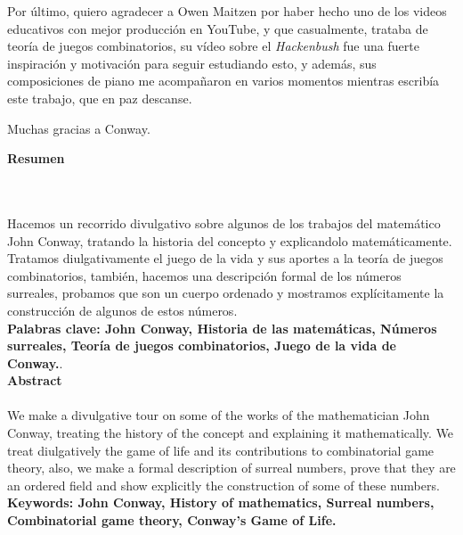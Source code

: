 Por \'ultimo, quiero agradecer a Owen Maitzen por haber hecho uno de los videos educativos con mejor producci\'on en YouTube, y que casualmente, trataba de teor\'ia de juegos combinatorios, su v\'ideo sobre el \textit{Hackenbush} \cite{YTHackenbush} fue una fuerte inspiraci\'on y motivaci\'on para seguir estudiando esto, y adem\'as, sus composiciones de piano me acompa\~naron en varios momentos mientras escrib\'ia este trabajo, que en paz descanse. 

Muchas gracias a Conway.

\newpage{\pagestyle{empty}\cleardoublepage}

\newpage
\textbf{\LARGE Resumen}
\\\\
Hacemos un recorrido divulgativo sobre algunos de los trabajos del matemático John Conway, tratando la historia del concepto y explicandolo matemáticamente. Tratamos diulgativamente el juego de la vida y sus aportes a la teoría de juegos combinatorios, también, hacemos una descripción formal de los números surreales, probamos que son un cuerpo ordenado y mostramos explícitamente la construcción de algunos de estos números.\\[2.0cm]

\textbf{\small Palabras clave: John Conway, Historia de las matemáticas, Números surreales, Teoría de juegos combinatorios, Juego de la vida de Conway.}.\\

\textbf{\LARGE Abstract}\\\\
We make a divulgative tour on some of the works of the mathematician John Conway, treating the history of the concept and explaining it mathematically. We treat diulgatively the game of life and its contributions to combinatorial game theory, also, we make a formal description of surreal numbers, prove that they are an ordered field and show explicitly the construction of some of these numbers.\\[2.0cm]
\textbf{\small Keywords: John Conway, History of mathematics, Surreal numbers, Combinatorial game theory, Conway's Game of Life.}\\